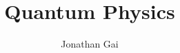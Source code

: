 
\usepackage{bbm}
\usepackage{nicefrac}
\author{Jonathan Gai}
\title{Quantum Physics}


\maketitle
\tableofcontents
{}
